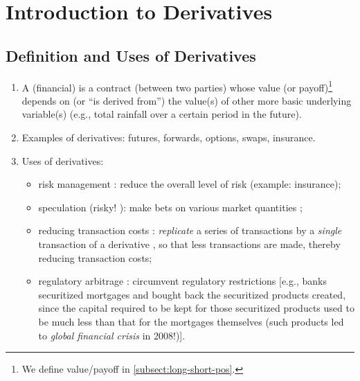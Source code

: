 \section{Introduction to Derivatives}
\label{sect:intro-deriv}
\subsection{Definition and Uses of Derivatives}
\begin{enumerate}
\item A (financial)  is a contract  (between
two parties) whose value (or payoff)\footnote{We define value/payoff in
\cref{subsect:long-short-pos}.} depends on (or ``is derived from'') the value(s)
of other more basic underlying variable(s) (e.g., total rainfall
 over a certain period in the future).

\item Examples of derivatives: futures, forwards, options, swaps, insurance.

\item Uses of derivatives:
\begin{itemize}
\item risk management : reduce the overall level of risk
 (example: insurance);

\item speculation  (risky!
{\color{red}}): make bets  on
various market quantities ;

\item reducing transaction costs 
: \emph{replicate}  a
series of transactions
  
by a \emph{single} transaction  of a derivative
, so that less transactions are made, thereby reducing
transaction costs;

\item regulatory arbitrage : circumvent regulatory
restrictions  [e.g., banks  securitized mortgages
 and bought back the securitized products created, since the
capital required to be kept for those securitized products used to be much less
than that for the mortgages themselves \parencite[Section~8.3]{hull2022options}
(such products led to \emph{global financial crisis}  in 2008!)].
\end{itemize}
\end{enumerate}

